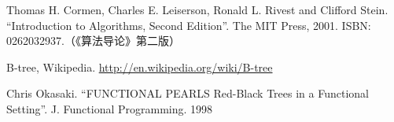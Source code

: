 \documentclass{ctexart}
\begin{document}
\ifx\wholebook\relax \else
\begin{thebibliography}{99}

Thomas H. Cormen, Charles E. Leiserson, Ronald L. Rivest and Clifford Stein. ``Introduction to Algorithms, Second Edition''. The MIT Press, 2001. ISBN: 0262032937.（《算法导论》第二版）

B-tree, Wikipedia. \url{http://en.wikipedia.org/wiki/B-tree}

Chris Okasaki. ``FUNCTIONAL PEARLS Red-Black Trees in a Functional Setting''. J. Functional Programming. 1998

\end{thebibliography}
\end{document}
